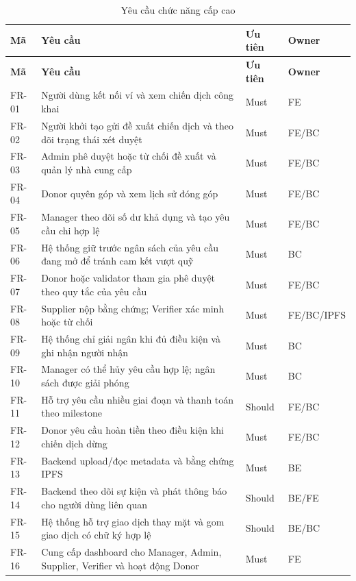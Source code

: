 \begin{longtable}{| p{1.2cm} | p{7.3cm} | p{2cm} | p{2.3cm} |}
\caption{Yêu cầu chức năng cấp cao}\label{tab:functional-requirements}\\
\hline
\textbf{Mã} & \textbf{Yêu cầu} & \textbf{Ưu tiên} & \textbf{Owner} \\
\hline
\endfirsthead
\hline
\textbf{Mã} & \textbf{Yêu cầu} & \textbf{Ưu tiên} & \textbf{Owner} \\
\hline
\endhead
FR-01 & Người dùng kết nối ví và xem chiến dịch công khai & Must & FE \\ \hline
FR-02 & Người khởi tạo gửi đề xuất chiến dịch và theo dõi trạng thái xét duyệt & Must & FE/BC \\ \hline
FR-03 & Admin phê duyệt hoặc từ chối đề xuất và quản lý nhà cung cấp & Must & FE/BC \\ \hline
FR-04 & Donor quyên góp và xem lịch sử đóng góp & Must & FE/BC \\ \hline
FR-05 & Manager theo dõi số dư khả dụng và tạo yêu cầu chi hợp lệ & Must & FE/BC \\ \hline
FR-06 & Hệ thống giữ trước ngân sách của yêu cầu đang mở để tránh cam kết vượt quỹ & Must & BC \\ \hline
FR-07 & Donor hoặc validator tham gia phê duyệt theo quy tắc của yêu cầu & Must & FE/BC \\ \hline
FR-08 & Supplier nộp bằng chứng; Verifier xác minh hoặc từ chối & Must & FE/BC/IPFS \\ \hline
FR-09 & Hệ thống chỉ giải ngân khi đủ điều kiện và ghi nhận người nhận & Must & BC \\ \hline
FR-10 & Manager có thể hủy yêu cầu hợp lệ; ngân sách được giải phóng & Must & BC \\ \hline
FR-11 & Hỗ trợ yêu cầu nhiều giai đoạn và thanh toán theo milestone & Should & FE/BC \\ \hline
FR-12 & Donor yêu cầu hoàn tiền theo điều kiện khi chiến dịch dừng & Must & FE/BC \\ \hline
FR-13 & Backend upload/đọc metadata và bằng chứng IPFS & Must & BE \\ \hline
FR-14 & Backend theo dõi sự kiện và phát thông báo cho người dùng liên quan & Should & BE/FE \\ \hline
FR-15 & Hệ thống hỗ trợ giao dịch thay mặt và gom giao dịch có chữ ký hợp lệ & Should & BE/BC \\ \hline
FR-16 & Cung cấp dashboard cho Manager, Admin, Supplier, Verifier và hoạt động Donor & Must & FE \\
\hline
\end{longtable}

